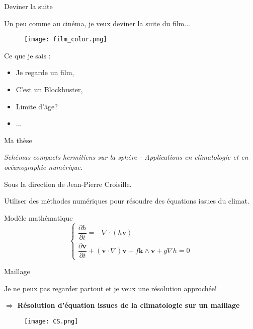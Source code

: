 \documentclass[11pt]{beamer}
\begin{document}

\begin{frame}{Deviner la suite}

Un peu comme au cinéma, je veux deviner la suite du film...

\begin{center}
\begin{figure}
\texttt{[image: film\_color.png]}
\end{figure}
\end{center}

Ce que je sais :
\begin{itemize}
\item Je regarde un film, \pause
\item C'est un Blockbuster, \pause
\item Limite d'âge?
\item ...
\end{itemize}

\end{frame}


\begin{frame}{Ma thèse}
\begin{center}
\textit{Schémas compacts hermitiens sur la sphère - Applications en climatologie et en océanographie numérique.}
\end{center}
Sous la direction de Jean-Pierre Croisille.

Utiliser des méthodes numériques pour résoudre des équations issues du climat.

\begin{block}{Modèle mathématique}
$$
\left\lbrace
\begin{array}{c}
\dfrac{\partial h}{\partial t} = - \nabla \cdot ( h \mathbf{v})\\
\dfrac{\partial \mathbf{v}}{\partial t} + (\mathbf{v} \cdot \nabla) \mathbf{v} + f \mathbf{k} \wedge \mathbf{v} + g \nabla h = 0
\end{array}
\right.
$$
\end{block}
\end{frame}



\begin{frame}{Maillage}

Je ne peux pas regarder partout et je veux une résolution approchée!

$\Rightarrow$ \textbf{Résolution d'équation issues de la climatologie sur un maillage}

\begin{center}
\begin{figure}
\texttt{[image: CS.png]}
\end{figure}
\end{center}

\end{frame}
\end{document}
